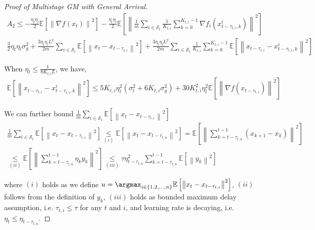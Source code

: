 \begin{proof}[Proof of Multistage GM with General Arrival]
\begin{equation}
\begin{gathered}
A_2
\leq - \frac{\eta_t\eta_l}{2} \mathbb{E}\left[\left\| \nabla f(x_t) \right\|^2\right] - \frac{\eta_t\eta_l}{2} \mathbb{E}\left[\left\| \frac{1}{m}\sum_{i\in\mathcal{S}_t} \frac{1}{K_{t,i}} \sum_{k=0}^{K_{t,i}-1} \nabla f_i(x_{t-\tau_{t,i},k}^i) \right\|^2\right] \\
\frac{3}{2} \eta_t\eta_l \sigma_g^2 +  \frac{3\eta_t\eta_l L^2}{2m} \sum_{i\in\mathcal{S}_t} \mathbb{E}\left[\left\|  x_t  - x_{t-\tau_{t,i}} \right\|^2\right] + \frac{3 \eta_t \eta_l L^2}{2 m} \sum_{i\in\mathcal{S}_t} \frac{1}{K_{t,i}} \sum_{k=0}^{K_{t,i}-1} \mathbb{E}\left[\left\|    x_{t-\tau_{t,i}}  -  x_{t-\tau_{t,i},k}^i \right\|^2\right]
\end{gathered}\nonumber
\end{equation}

When $\eta_l\leq \frac{1}{8K_{t,i}L}$, we have,
\begin{equation}
\begin{gathered}
\mathbb{E}\left[\left\| x_{t-\tau_{t,i}}-x_{t-\tau_{t,i},k}^i  \right\|^2\right] \leq 5 K_{t,i}\eta_l^2\left(\sigma_l^2+6K_{t,i}\sigma_g^2\right)+30K_{t,i}^2\eta_l^2 \mathbb{E}\left[\left\| \nabla f(x_{t-\tau_{t,i}})\right\|^2\right]
\end{gathered}\nonumber
\end{equation}

We can further bound $\frac{1}{m}\sum_{i\in\mathcal{S}_t} \mathbb{E}\left[\left\| x_t - x_{t-\tau_{t,i}} \right\|^2\right]$
\begin{equation}
\begin{gathered}
\frac{1}{m}\sum_{i\in\mathcal{S}_t} \mathbb{E}\left[\left\| x_t - x_{t-\tau_{t,i}} \right\|^2\right] 
\underset{(i)}{\leq}  \mathbb{E}\left[\left\| x_t - x_{t-\tau_{t,u}} \right\|^2\right] = \mathbb{E}\left[\left\| \sum_{k=t-\tau_{t,u}}^{t-1} \left(x_{k+1}-x_k\right) \right\|^2\right] \\
\underset{(ii)}{\leq} \mathbb{E}\left[\left\| \sum_{k=t-\tau_{t,u}}^{t-1} \eta_k y_k \right\|^2\right] \underset{(iii)}{\leq} \tau \eta_{t-\tau_{t,u}}^2 \sum_{k=t-\tau_{t,u}}^{t-1}\mathbb{E}\left[\left\|  y_k \right\|^2\right]
\end{gathered}\nonumber
\end{equation}

where $(i)$ holds as we define $u=\argmax_{i\in\{1,2,\dots,n\}}\mathbb{E}\left[\left\| x_t - x_{t-\tau_{t,i}} \right\|^2\right] $, $(ii)$ follows from the definition of $y_k$, $(iii)$ holds as bounded maximum delay assumption, i.e. $\tau_{t,i}\leq \tau$ for any $t$ and $i$, and learning rate is decaying, i.e. $\eta_t \leq \eta_{t-\tau_{t,u}}$.



\end{proof}
